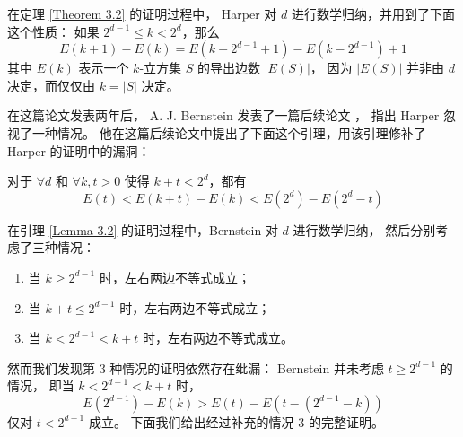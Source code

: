 在定理 \ref{Theorem 3.2} 的证明过程中，
Harper 对 $d$ 进行数学归纳，并用到了下面这个性质：
如果 $2^{d - 1} \le k < 2^d$，那么
\begin{equation*}
E(k + 1) - E(k) = E(k - 2^{d - 1} + 1) - E(k - 2^{d - 1}) + 1
\end{equation*}
其中 $E(k)$ 表示一个 $k$-立方集 $S$ 的导出边数 $|E(S)|$，
因为 $|E(S)|$ 并非由 $d$ 决定，而仅仅由 $k = |S|$ 决定。

在这篇论文发表两年后，
A. J. Bernstein 发表了一篇后续论文 \cite{Bernstein.1967}，
指出 Harper 忽视了一种情况。
他在这篇后续论文中提出了下面这个引理，用该引理修补了 Harper 的证明中的漏洞：

\begin{lemma}
\label{Lemma 3.2}
对于 $\forall d$ 和 $\forall k, t > 0$ 使得 $k + t < 2^d$，都有
\begin{equation*}
E(t) < E(k + t) − E(k) < E(2^d) − E(2^d − t)
\end{equation*}
\end{lemma}

在引理 \ref{Lemma 3.2} 的证明过程中，Bernstein 对 $d$ 进行数学归纳，
然后分别考虑了三种情况：
\begin{enumerate}[(1)]
	\item 当 $k \ge 2^{d − 1}$ 时，左右两边不等式成立；
	\item 当 $k + t \le 2^{d − 1}$ 时，左右两边不等式成立；
	\item 当 $k < 2^{d - 1} < k + t$ 时，左右两边不等式成立。
\end{enumerate}

然而我们发现第 3 种情况的证明依然存在纰漏：
Bernstein 并未考虑 $t \ge 2^{d − 1}$ 的情况，
即当 $k < 2^{d − 1} < k + t$ 时，
\begin{equation*}
E(2^{d − 1}) − E(k) > E(t) − E(t − (2^{d − 1} − k))
\end{equation*}
仅对 $t < 2^{d - 1}$ 成立。
下面我们给出经过补充的情况 3 的完整证明。

